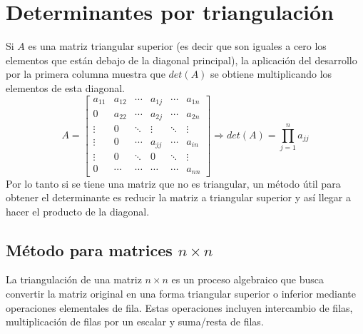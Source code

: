 \documentclass{article}
\begin{document}
\section*{Determinantes por triangulación}
Si $A$ es una matriz triangular superior (es decir que son iguales a cero los elementos que están debajo de la diagonal principal), la aplicación del desarrollo por la primera columna muestra que $det(A)$ se obtiene multiplicando los elementos de esta diagonal.
$$
A=\begin{bmatrix} 
a_{11} & a_{12} & \cdots & a_{1j} & \cdots & a_{1n} \\ 
0 & a_{22} & \cdots & a_{2j} & \cdots & a_{2n}\\ 
\vdots & 0 & \ddots & \vdots & \ddots & \vdots \\ 
\vdots & 0 & \cdots & a_{jj} & \cdots & a_{in} \\
\vdots & 0 & \ddots & 0 & \ddots & \vdots \\
0 & \cdots & \cdots & \cdots & \cdots & a_{nn}
\end{bmatrix}
\Rightarrow det(A) = \prod_{j=1}^{n}a_{jj}
$$
Por lo tanto si se tiene una matriz que no es triangular, un método útil para obtener el determinante es reducir la matriz a triangular superior y así llegar a hacer el producto de la diagonal.
\subsection*{Método para matrices $n \times n$}
La triangulación de una matriz $n\times n$ es un proceso algebraico que busca convertir la matriz original en una forma triangular superior o inferior mediante operaciones elementales de fila. Estas operaciones incluyen intercambio de filas, multiplicación de filas por un escalar y suma/resta de filas.
\end{document}
